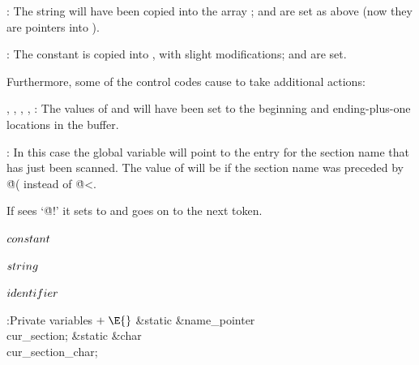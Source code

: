 \yskip\hang {}: The string will have been copied into the array
;  and  are set as
above (now they are
pointers into ).

\yskip\hang {}: The constant is copied into , with
slight modifications;  and  are set.

\yskip\noindent Furthermore, some of the control codes cause
 to take additional actions:

\yskip\hang {}, , , \PB{$\TeXxstring$},
: The values of  and  will
have been set to
the beginning and ending-plus-one locations in the buffer.

\yskip\hang {}: In this case the global variable  will
point to the  entry for the section name that has just been
scanned.
The value of  will be  if the section
name was
preceded by \.{@(} instead of \.{@<}.

\yskip\noindent If  sees `\.{@!}'
it sets  to  and goes on to the next
token.

\Y\B\4\D$\\{constant}$ \5
\par
\B\4\D$\\{string}$ \5
\par
\B\4\D$\\{identifier}$ \5
\par
\Y\B\4:Private variables\X${}\mathrel+\E{}$\6
\&{static} \&{name\_pointer} \\{cur\_section};\6
\&{static} \&{char} \\{cur\_section\_char};\par
\fi

